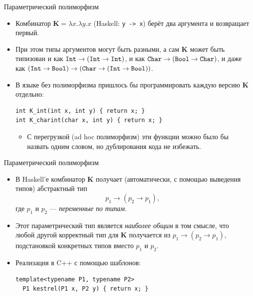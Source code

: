 \documentclass[xcolor=dvipsnames]{beamer}
\newcommand{\Int}{\mbox{\texttt{Int}}}
\newcommand{\Bool}{\mbox{\texttt{Bool}}}
\newcommand{\Char}{\mbox{\texttt{Char}}}
\newcommand{\Kx}{\mathbf{K}}
\begin{document}
\begin{frame}[fragile]{Параметрический полиморфизм}
 
 \begin{itemize}[<+->]
  \item Комбинатор $\Kx = \lambda x. \lambda y. x$ (Haskell: \texttt{\x y -> x}) берёт два аргумента и возвращает первый.
  \item При этом типы аргументов могут быть разными, а сам $\Kx$ может быть типизован и как $\Int \to (\Int \to \Int)$, и как
  $\Char \to (\Bool \to \Char)$, и даже как
  $(\Int \to \Bool) \to (\Char \to (\Int \to \Bool))$.
  \item В языке без полиморфизма пришлось бы программировать каждую версию $\Kx$ отдельно:
  \begin{verbatim}
int K_int(int x, int y) { return x; }
int K_charint(char x, int y) { return x; }
  \end{verbatim}
  \begin{itemize}
  \item С перегрузкой (ad hoc полиморфизм) эти функции можно было бы назвать одним словом, но дублирования кода не избежать.
  \end{itemize}
 \end{itemize}


 
\end{frame}


\begin{frame}[fragile]{Параметрический полиморфизм}

\begin{itemize}[<+->]
 \item В Haskell'е комбинатор $\Kx$ получает (автоматически, с помощью выведения типов) абстрактный тип
 \[ p_1 \to (p_2 \to p_1), \]
 где $p_1$ и $p_2$ --- {\em переменные по типам.}
 \item Этот параметрический тип является {\em наиболее общим} в том смысле, что любой другой корректный тип для $\Kx$ получается из \( p_1 \to (p_2 \to p_1), \) подстановкой конкретных типов вместо $p_1$ и $p_2$. 
 \item Реализация в C++ с помощью шаблонов:
\begin{verbatim}
template<typename P1, typename P2>
  P1 kestrel(P1 x, P2 y) { return x; }
\end{verbatim}
\end{itemize}

 
\end{frame}
\end{document}
